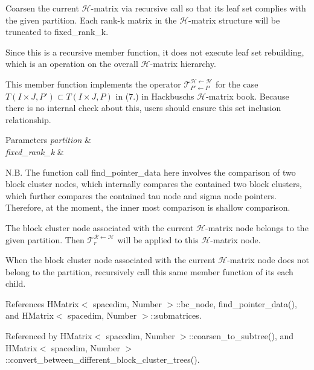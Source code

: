 Coarsen the current $\mathcal{H}$-\/matrix via recursive call so that its leaf set complies with the given partition. Each rank-\/k matrix in the $\mathcal{H}$-\/matrix structure will be truncated to {\ttfamily fixed\+\_\+rank\+\_\+k}.

Since this is a recursive member function, it does not execute leaf set rebuilding, which is an operation on the overall $\mathcal{H}$-\/matrix hierarchy.

This member function implements the operator $\mathcal{T}_{P' \leftarrow P}^{\mathcal{H} \leftarrow \mathcal{H}}$ for the case $T(I \times J, P') \subset T(I \times J, P)$ in (7.) in Hackbusch\textquotesingle{}s $\mathcal{H}$-\/matrix book. Because there is no internal check about this, users should ensure this set inclusion relationship.


\begin{DoxyParams}{Parameters}
{\em partition} & \\
\hline
{\em fixed\+\_\+rank\+\_\+k} & \\
\hline
\end{DoxyParams}
N.\+B. The function call {\ttfamily find\+\_\+pointer\+\_\+data} here involves the comparison of two block cluster nodes, which internally compares the contained two block clusters, which further compares the contained tau node and sigma node pointers. Therefore, at the moment, the inner most comparison is shallow comparison.

The block cluster node associated with the current $\mathcal{H}$-\/matrix node belongs to the given {\ttfamily partition}. Then $\mathcal{T}_r^{\mathcal{R} \leftarrow \mathcal{H}}$ will be applied to this $\mathcal{H}$-\/matrix node.

When the block cluster node associated with the current $\mathcal{H}$-\/matrix node does not belong to the {\ttfamily partition}, recursively call this same member function of its each child.

References H\+Matrix$<$ spacedim, Number $>$\+::bc\+\_\+node, find\+\_\+pointer\+\_\+data(), and H\+Matrix$<$ spacedim, Number $>$\+::submatrices.



Referenced by H\+Matrix$<$ spacedim, Number $>$\+::coarsen\+\_\+to\+\_\+subtree(), and H\+Matrix$<$ spacedim, Number $>$\+::convert\+\_\+between\+\_\+different\+\_\+block\+\_\+cluster\+\_\+trees().

\mbox{\label{classHMatrix_a27c7390b792e6e47ab2861616a997d99}} 
